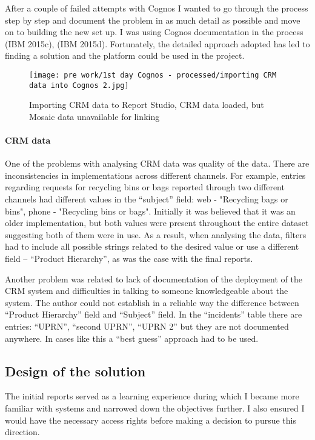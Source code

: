 After a couple of failed attempts with Cognos I wanted to go through the process step by step and document the problem in as much detail as possible and move on to building the new set up. I was using Cognos documentation in the process (IBM 2015c), (IBM 2015d). Fortunately, the detailed approach adopted has led to finding a solution and the platform could be used in the project.

\begin{figure}[hp]
\centering
     \texttt{[image: pre work/1st day Cognos - processed/importing CRM data into Cognos 2.jpg]}
      \caption{Importing CRM data to Report Studio, CRM data loaded, but Mosaic data unavailable for linking}
       \label{normal_case}
\end{figure}
				
				\paragraph{CRM data}
				
One of the problems with analysing CRM data was quality of the data. There are inconsistencies in implementations across different channels. For example, entries regarding requests for recycling bins or bags reported through two different channels had different values in the “subject” field: web - "Recycling bags or bins", phone - "Recycling bins or bags". Initially it was believed that it was an older implementation, but both values were present throughout the entire dataset suggesting both of them were in use. As a result, when analysing the data, filters had to include all possible strings related to the desired value or use a different field – “Product Hierarchy”, as was the case with the final reports.

Another problem was related to lack of documentation of the deployment of the CRM system and difficulties in talking to someone knowledgeable about the system. The author could not establish in a reliable way the difference between “Product Hierarchy” field and “Subject” field. In the “incidents” table there are entries: “UPRN”, “second UPRN”, “UPRN 2” but they are not documented anywhere. In cases like this a “best guess” approach had to be used. 
				
		\subsection{Design of the solution}
		
The initial reports served as a learning experience during which I became more familiar with systems and narrowed down the objectives further. I also ensured I would have the necessary access rights before making a decision to pursue this direction.

